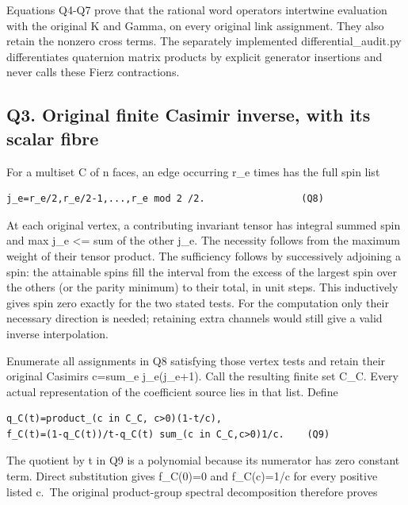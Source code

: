 \documentclass[11pt,a4paper]{article}
\renewcommand{\[}{\begingroup\small\originaldisplaystart}
\renewcommand{\]}{\originaldisplayend\endgroup}
\begin{document}
Equations Q4-Q7 prove that the rational word operators intertwine
evaluation with the original K and Gamma, on every original link
assignment. They also retain the nonzero cross terms. The separately
implemented
{\ttfamily d\allowbreak{}i\allowbreak{}f\allowbreak{}f\allowbreak{}e\allowbreak{}r\allowbreak{}e\allowbreak{}n\allowbreak{}t\allowbreak{}i\allowbreak{}a\allowbreak{}l\allowbreak{}\_\allowbreak{}a\allowbreak{}u\allowbreak{}d\allowbreak{}i\allowbreak{}t\allowbreak{}.\allowbreak{}p\allowbreak{}y\allowbreak{}}
differentiates quaternion matrix products by explicit generator
insertions and never calls these Fierz contractions.

\subsection{Q3. Original finite Casimir inverse, with its scalar
fibre}\label{q3.-original-finite-casimir-inverse-with-its-scalar-fibre}

For a multiset C of n faces, an edge occurring r\_e times has the full
spin list

\begin{verbatim}
j_e=r_e/2,r_e/2-1,...,r_e mod 2 /2.                 (Q8)
\end{verbatim}

At each original vertex, a contributing invariant tensor has integral
summed spin and max j\_e \textless= sum of the other j\_e. The necessity
follows from the maximum weight of their tensor product. The sufficiency
follows by successively adjoining a spin: the attainable spins fill the
interval from the excess of the largest spin over the others (or the
parity minimum) to their total, in unit steps. This inductively gives
spin zero exactly for the two stated tests. For the computation only
their necessary direction is needed; retaining extra channels would
still give a valid inverse interpolation.

Enumerate all assignments in Q8 satisfying those vertex tests and retain
their original Casimirs c=sum\_e j\_e(j\_e+1). Call the resulting finite
set C\_C. Every actual representation of the coefficient source lies in
that list. Define

\begin{verbatim}
q_C(t)=product_(c in C_C, c>0)(1-t/c),
f_C(t)=(1-q_C(t))/t-q_C(t) sum_(c in C_C,c>0)1/c.    (Q9)
\end{verbatim}

The quotient by t in Q9 is a polynomial because its numerator has zero
constant term. Direct substitution gives f\_C(0)=0 and f\_C(c)=1/c for
every positive listed c.~The original product-group spectral
decomposition therefore proves
\end{document}
